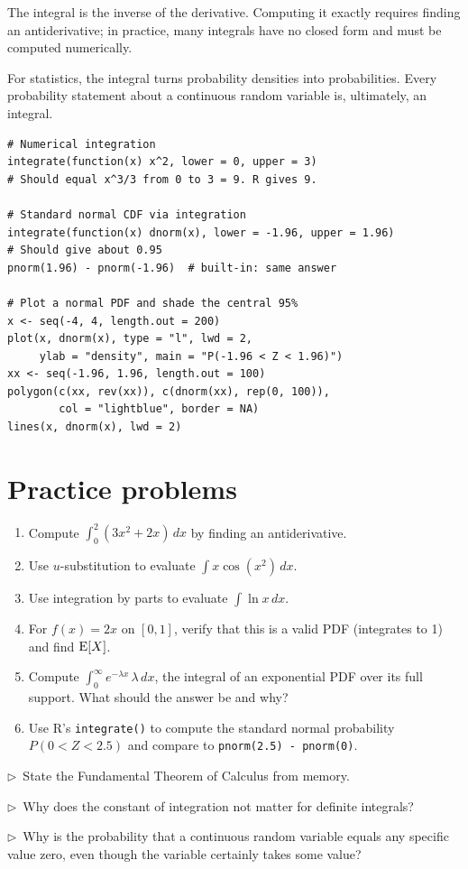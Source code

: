 \begin{keyinsight}
The integral is the inverse of the derivative. Computing it exactly requires finding an antiderivative; in practice, many integrals have no closed form and must be computed numerically.

For statistics, the integral turns probability densities into probabilities. Every probability statement about a continuous random variable is, ultimately, an integral.
\end{keyinsight}

\begin{codelab}
\begin{lstlisting}[language=Rlang]
# Numerical integration
integrate(function(x) x^2, lower = 0, upper = 3)
# Should equal x^3/3 from 0 to 3 = 9. R gives 9.

# Standard normal CDF via integration
integrate(function(x) dnorm(x), lower = -1.96, upper = 1.96)
# Should give about 0.95
pnorm(1.96) - pnorm(-1.96)  # built-in: same answer

# Plot a normal PDF and shade the central 95%
x <- seq(-4, 4, length.out = 200)
plot(x, dnorm(x), type = "l", lwd = 2,
     ylab = "density", main = "P(-1.96 < Z < 1.96)")
xx <- seq(-1.96, 1.96, length.out = 100)
polygon(c(xx, rev(xx)), c(dnorm(xx), rep(0, 100)),
        col = "lightblue", border = NA)
lines(x, dnorm(x), lwd = 2)
\end{lstlisting}
\end{codelab}

\section{Practice problems}

\begin{enumerate}
  \item Compute $\int_0^2 (3x^2 + 2x)\,dx$ by finding an antiderivative.
  \item Use $u$-substitution to evaluate $\int x \cos(x^2)\,dx$.
  \item Use integration by parts to evaluate $\int \ln x \,dx$.
  \item For $f(x) = 2x$ on $[0, 1]$, verify that this is a valid PDF (integrates to 1) and find $\operatorname{E}[X]$.
  \item Compute $\int_0^{\infty} e^{-\lambda x}\,\lambda\,dx$, the integral of an exponential PDF over its full support. What should the answer be and why?
  \item Use R's \texttt{integrate()} to compute the standard normal probability $P(0 < Z < 2.5)$ and compare to \texttt{pnorm(2.5) - pnorm(0)}.
\end{enumerate}

\begin{reflect}
$\triangleright$~State the Fundamental Theorem of Calculus from memory.

\smallskip
$\triangleright$~Why does the constant of integration not matter for definite integrals?

\smallskip
$\triangleright$~Why is the probability that a continuous random variable equals any specific value zero, even though the variable certainly takes some value?
\end{reflect}
